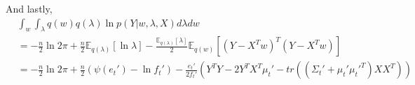 \documentclass[twoside]{homework}
\begin{document}
And lastly,
\begin{align*}
&\int_w \int_\lambda q(w) q(\lambda) \ln p(Y | w, \lambda, X) d\lambda dw\\
&=  -\frac{n}{2} \ln 2\pi + \frac{n}{2} \mathbb{E}_{q(\lambda)}[\ln \lambda] - \frac{\mathbb{E}_{q(\lambda)}[\lambda]}{2} \mathbb{E}_{q(w)}[(Y - X^Tw)^T (Y - X^Tw)]\\
&= -\frac{n}{2} \ln 2\pi + \frac{n}{2}(\psi(e_t') - \ln f_t') - \frac{e_t'}{2f_t'}(Y^T Y - 2 Y^T X^T \mu_t' - tr((\Sigma_t' + \mu_t' {\mu_t'}^T) X X^T)) \\
\end{align*}
\end{document}
